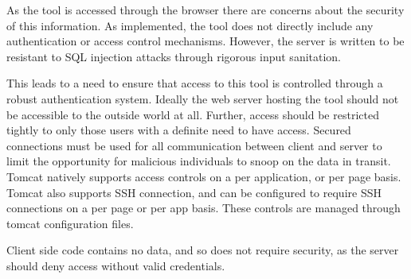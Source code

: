 As the tool is accessed through the browser there are concerns about the security of this information. As implemented, the tool does not directly include any authentication or access control mechanisms. However, the server is written to be resistant to SQL injection attacks through rigorous input sanitation.

This leads to a need to ensure that access to this tool is controlled through a robust authentication system. Ideally the web server hosting the tool should not be accessible to the outside world at all. Further, access should be restricted tightly to only those users with a definite need to have access. Secured connections must be used for all communication between client and server to limit the opportunity for malicious individuals to snoop on the data in transit. Tomcat natively supports access controls on a per application, or per page basis. Tomcat also supports SSH connection, and can be configured to require SSH connections on a per page or per app basis. These controls are managed through tomcat configuration files. 

Client side code contains no data, and so does not require security, as the server should deny access without valid credentials.